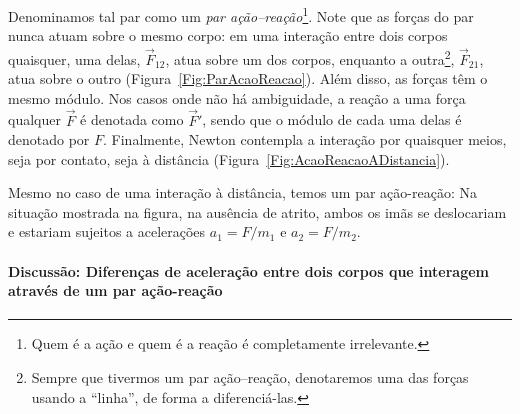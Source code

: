 \noindent{}Denominamos tal par como um \emph{par ação--reação}\footnote{Quem é a ação e quem é a reação é completamente irrelevante.}. Note que as forças do par nunca atuam sobre o mesmo corpo: em uma interação entre dois corpos quaisquer, uma delas, $\vec{F}_{12}$, atua sobre um dos corpos, enquanto a outra\footnote{Sempre que tivermos um par ação--reação, denotaremos uma das forças usando a ``linha'', de forma a diferenciá-las.}, $\vec{F}_{21}$, atua sobre o outro (Figura~\ref{Fig:ParAcaoReacao}). Além disso, as forças têm o mesmo módulo. Nos casos onde não há ambiguidade, a reação a uma força qualquer $\vec{F}$ é denotada como $\vec{F}'$, sendo que o módulo de cada uma delas é denotado por $F$. Finalmente, Newton contempla a interação por quaisquer meios, seja por contato, seja à distância (Figura~\ref{Fig:AcaoReacaoADistancia}).


\begin{marginfigure}
\centering
{}
\caption{Mesmo no caso de uma interação à distância, temos um par ação-reação: Na situação mostrada na figura, na ausência de atrito, ambos os imãs se deslocariam e estariam sujeitos a acelerações $a_1 = F/m_1$ e $a_2 = F/{m_2}$.\label{Fig:AcaoReacaoADistancia}}
\end{marginfigure}

\paragraph{Discussão: Diferenças de aceleração entre dois corpos que interagem através de um par ação-reação}

